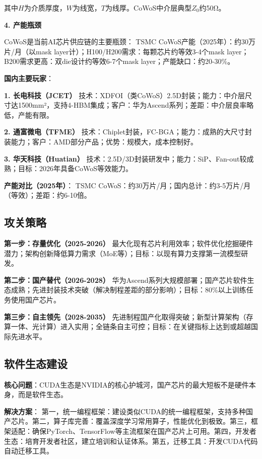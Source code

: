 其中$H$为介质厚度，$W$为线宽，$T$为线厚。CoWoS中介层典型$Z_0$约50Ω。

\textbf{4. 产能瓶颈}

CoWoS是当前AI芯片供应链的主要瓶颈：
TSMC CoWoS产能（2025年）：约30万片/月（以mask layer计）；H100/H200需求：每颗芯片约等效3-4个mask layer；B200需求更高：双die设计约等效6-7个mask layer；产能缺口：约20-30\%。

\textbf{国内主要玩家}：

\textbf{1. 长电科技（JCET）}
技术：XDFOI（类CoWoS）2.5D封装；能力：中介层尺寸达1500mm²，支持4-HBM集成；客户：华为Ascend系列；差距：中介层良率略低，产能有限。

\textbf{2. 通富微电（TFME）}
技术：Chiplet封装，FC-BGA；能力：成熟的大尺寸封装能力；客户：AMD部分产品；优势：规模大，成本控制好。

\textbf{3. 华天科技（Huatian）}
技术：2.5D/3D封装研发中；能力：SiP、Fan-out较成熟；目标：2026年具备CoWoS等效能力。

\textbf{产能对比（2025年）}：
TSMC CoWoS：约30万片/月；国内总计：约3-5万片/月（等效）；差距：约6-10倍。

\subsection{攻关策略}

\textbf{第一步：存量优化（2025-2026）}
最大化现有芯片利用效率；软件优化挖掘硬件潜力；架构创新降低算力需求（MoE等）；目标：以现有算力支撑第一流模型研发。

\textbf{第二步：国产替代（2026-2028）}
华为Ascend系列大规模部署；国产芯片软件生态成熟；先进封装技术突破（解决制程差距的部分影响）；目标：80\%以上训练任务使用国产芯片。

\textbf{第三步：自主领先（2028-2035）}
先进制程国产化取得突破；新型计算架构（存算一体、光计算）进入实用；全链条自主可控；目标：在关键指标上达到或超越国际先进水平。

\subsection{软件生态建设}

\textbf{核心问题}：CUDA生态是NVIDIA的核心护城河，国产芯片的最大短板不是硬件本身，而是软件生态。

\textbf{解决方案}：
第一，统一编程框架：建设类似CUDA的统一编程框架，支持多种国产芯片。第二，算子库完善：覆盖深度学习常用算子，性能优化到极致。第三，框架适配：确保PyTorch、TensorFlow等主流框架在国产芯片上可用。第四，开发者生态：培育开发者社区，建立培训和认证体系。第五，迁移工具：开发CUDA代码自动迁移工具。

